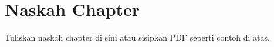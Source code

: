 \documentclass[bookchapter]{unnes-ta_plus}
\begin{document}
\maketitleunnes
\unnesPersetujuanPembimbing

\tableofcontents
\unnesMainMatter

\chapter{Naskah Chapter}
% 
Tuliskan naskah chapter di sini atau sisipkan PDF seperti contoh di atas.
\end{document}
